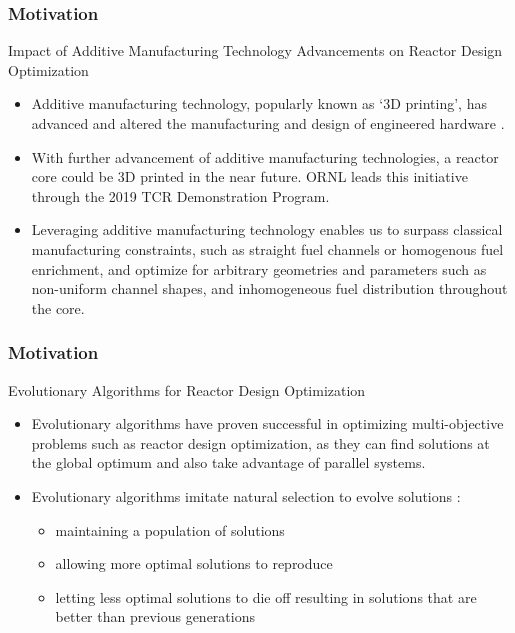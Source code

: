 \begin{frame}
    \frametitle{Motivation}
    \begin{block}{Impact of Additive Manufacturing Technology Advancements on 
        Reactor Design Optimization}
        \begin{itemize}
            \item Additive manufacturing technology, popularly known as `3D printing', 
            has advanced and altered the manufacturing and design of engineered hardware
            \cite{simpson_considerations_2019}. 
            \item With further advancement of additive manufacturing technologies, a reactor 
            core could be 3D printed in the near future. 
            \acrlong{ORNL} leads this initiative through the 2019 \acrlong{TCR} Demonstration 
            Program. 
            \item Leveraging additive manufacturing technology enables us to surpass classical 
            manufacturing constraints, such as straight fuel channels or homogenous fuel 
            enrichment, and optimize for arbitrary geometries and parameters 
            such as non-uniform channel shapes, and inhomogeneous fuel distribution 
            throughout the core. 
          \end{itemize}
    \end{block}
  \end{frame}

  \begin{frame}
    \frametitle{Motivation}
    \begin{block}{Evolutionary Algorithms for Reactor Design Optimization}
        \begin{itemize}
            \item Evolutionary algorithms have proven successful in optimizing multi-objective 
            problems such as reactor design optimization, as they can find solutions at the global 
            optimum and also take advantage of parallel systems. 
            \item Evolutionary algorithms imitate natural selection to evolve solutions 
            \cite{renner_genetic_2003}:
            \begin{itemize}
                \item maintaining a population of solutions
                \item allowing more optimal solutions to reproduce 
                \item letting less optimal solutions to die off resulting in 
                solutions that are better than previous generations
            \end{itemize}
            \end{itemize}
    \end{block}
  \end{frame}
    